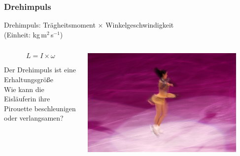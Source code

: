 \documentclass{beamer}
\begin{document}
\begin{frame}
\frametitle{Drehimpuls}

Drehimpuls: Trägheitsmoment \(\times\) Winkelgeschwindigkeit \\ (Einheit: kg\(\,\)m$^2\,$s$^{-1}$)



\begin{columns}[c]

\begin{column}{5cm}



\[
L = I\times \omega
\]


Der Drehimpuls ist eine Erhaltungsgröße \\[0.2 cm]


Wie kann die Eisläuferin ihre Pirouette beschleunigen oder verlangsamen?


\end{column}

\begin{column}{5cm}


\begin{center}
\includegraphics[width=0.9\textwidth]{figureskater.jpg}
\end{center}

\end{column}


\end{columns}


\end{frame}


\end{document}
